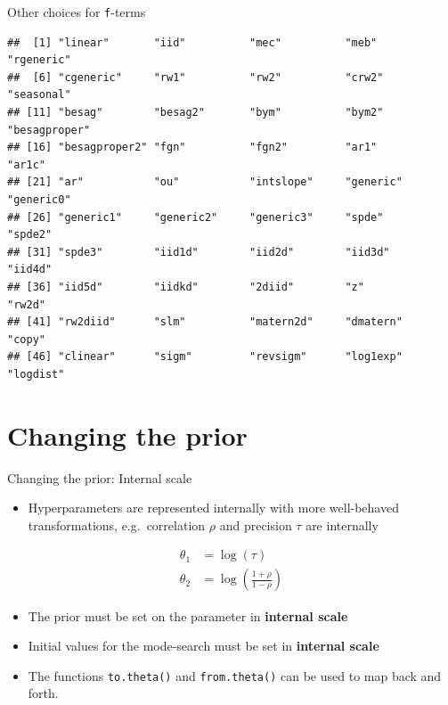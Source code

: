 \documentclass[
  handout]{beamer}
\providecommand{\tightlist}{%
  \setlength{\itemsep}{0pt}\setlength{\parskip}{0pt}}
\begin{document}
\begin{frame}[fragile]{Other choices for \texttt{f}-terms}
\protect\hypertarget{other-choices-for-f-terms}{}
\small

\begin{verbatim}
##  [1] "linear"       "iid"          "mec"          "meb"          "rgeneric"    
##  [6] "cgeneric"     "rw1"          "rw2"          "crw2"         "seasonal"    
## [11] "besag"        "besag2"       "bym"          "bym2"         "besagproper" 
## [16] "besagproper2" "fgn"          "fgn2"         "ar1"          "ar1c"        
## [21] "ar"           "ou"           "intslope"     "generic"      "generic0"    
## [26] "generic1"     "generic2"     "generic3"     "spde"         "spde2"       
## [31] "spde3"        "iid1d"        "iid2d"        "iid3d"        "iid4d"       
## [36] "iid5d"        "iidkd"        "2diid"        "z"            "rw2d"        
## [41] "rw2diid"      "slm"          "matern2d"     "dmatern"      "copy"        
## [46] "clinear"      "sigm"         "revsigm"      "log1exp"      "logdist"
\end{verbatim}
\end{frame}

\hypertarget{changing-the-prior}{%
\section{Changing the prior}\label{changing-the-prior}}

\begin{frame}[fragile]{Changing the prior: Internal scale}
\protect\hypertarget{changing-the-prior-internal-scale}{}
\begin{itemize}
\tightlist
\item
  Hyperparameters are represented internally with more well-behaved
  transformations, e.g.~correlation \(\rho\) and precision \(\tau\) are
  internally
\end{itemize}

\[
\begin{aligned}
  \theta_1 &= \log(\tau)\\
    \theta_2 &= \log\left(\frac{1+\rho}{1-\rho}\right)
\end{aligned}
\]

\begin{itemize}
\item
  The prior must be set on the parameter in \textbf{internal scale}
\item
  Initial values for the mode-search must be set in \textbf{internal
  scale}
\item
  The functions \texttt{to.theta()} and \texttt{from.theta()} can be
  used to map back and forth.
\end{itemize}
\end{frame}
\end{document}
